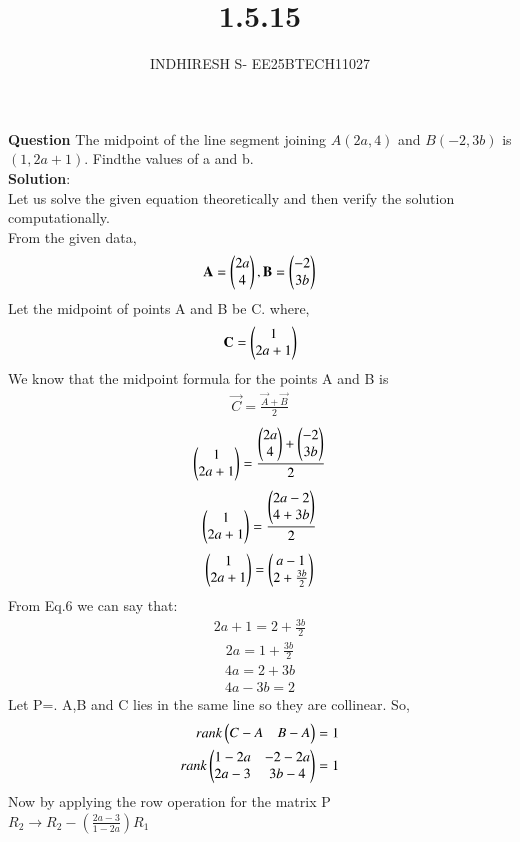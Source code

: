 \documentclass[journal]{IEEEtran}
\theoremstyle{remark}
\begin{document}

\onecolumn

\title{1.5.15}
\author{INDHIRESH S- EE25BTECH11027}
\maketitle


\renewcommand{\thefigure}{\theenumi}
\renewcommand{\thetable}{\theenumi}

\textbf{Question} The midpoint of the line segment joining $A(2a, 4)$ and $B(-2, 3b)$ is $(1, 2a + 1)$. Findthe values of a and b.\\
\textbf{Solution}:\\
Let us solve the given equation theoretically and then verify the solution computationally. \\
From the given data,
\begin{align}
\mathbf{A}= \begin{pmatrix}2a\\4\end{pmatrix} , \mathbf{B}=\begin{pmatrix}-2\\3b\end{pmatrix}
\end{align}
Let the midpoint of points A and B be C. where,
\begin{align}
    \mathbf{C}=\begin{pmatrix}1\\2a+1\end{pmatrix}
\end{align}
We know that the midpoint formula for the points A and B is
\begin{align}
    \vec{C}=\frac{\vec{A}+\vec{B}}{2}
    \end{align}
\begin{align}
    \begin{pmatrix}1\\2a+1\end{pmatrix}=\frac{\begin{pmatrix}2a\\4\end{pmatrix}+\begin{pmatrix}-2\\3b\end{pmatrix}}{2}
\end{align}
\begin{align}
    \begin{pmatrix}1\\2a+1\end{pmatrix}=\frac{\begin{pmatrix}2a-2\\4+3b\end{pmatrix}}{2}
\end{align}
\begin{align}
    \begin{pmatrix}1\\2a+1\end{pmatrix}=\begin{pmatrix}a-1\\2+\frac{3b}{2}\end{pmatrix}
\end{align}
From Eq.6 we can say that:
\begin{align}
    2a+1=2+\frac{3b}{2}
\end{align}
\begin{align}
    2a=1+\frac{3b}{2}
\end{align}
\begin{align}
    4a=2+3b
\end{align}
\begin{align}
    4a-3b=2
\end{align}
Let P=. A,B and C lies in the same line so they are collinear. So,
\begin{align}
   rank\begin{pmatrix}C-A&B-A\end{pmatrix}=1\\
   rank\begin{pmatrix}1-2a&-2-2a\\
   2a-3&3b-4\end{pmatrix}=1
\end{align}
Now by applying the row operation for the matrix P\\
$R_2\longrightarrow R_2-(\frac{2a-3}{1-2a})R_1$
\end{document}
